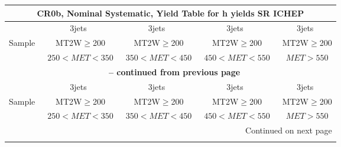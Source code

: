 \documentclass{article}
\begin{document}
\begin{longtable}{|l|c|c|c|c|} 
 
\multicolumn{5}{c}{ CR0b, Nominal Systematic, Yield Table for h yields SR ICHEP }\\* \hline 
  & 3jets  & 3jets  & 3jets  & 3jets \\* 
Sample  & ~MT2W$\ge$200  & ~MT2W$\ge$200  & ~MT2W$\ge$200  & ~MT2W$\ge$200 \\* 
  & ~$250<MET<350$  & ~$350<MET<450$  & ~$450<MET<550$  & ~$MET>550$ \\* 
\hline \hline 
\endfirsthead 
 
\multicolumn{5}{c}{{\bfseries \tablename\ \thetable{} -- continued from previous page}}\\* \hline 
  & 3jets  & 3jets  & 3jets  & 3jets \\* 
Sample  & ~MT2W$\ge$200  & ~MT2W$\ge$200  & ~MT2W$\ge$200  & ~MT2W$\ge$200 \\* 
  & ~$250<MET<350$  & ~$350<MET<450$  & ~$450<MET<550$  & ~$MET>550$ \\* 
\hline \hline 
\endhead 
 
\multicolumn{5}{|r|}{{Continued on next page}}\\* \hline 
\endfoot 
 
 
\endlastfoot 
 

\end{longtable}
\end{document}
